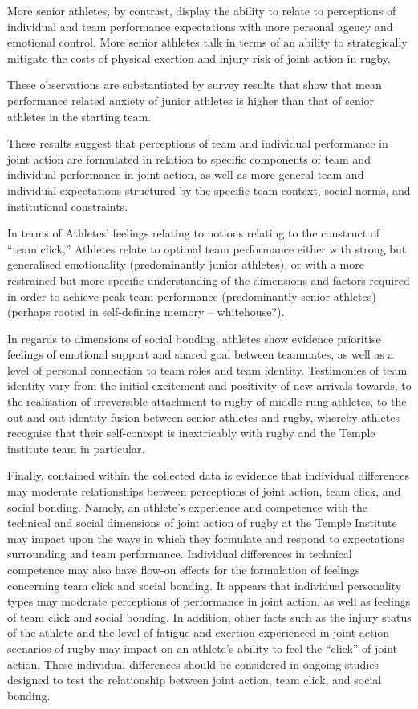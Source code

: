 More senior athletes, by contrast, display the ability to relate to perceptions of individual and team performance expectations with more personal agency and emotional control.  More senior athletes talk in terms of an ability to strategically mitigate the costs of physical exertion and injury risk of joint action in rugby,

These observations are substantiated by survey results that show that mean performance related anxiety of junior athletes is higher than that of senior athletes in the starting team.

These results suggest that perceptions of team and individual performance in joint action are formulated in relation to specific components of team and individual performance in joint action, as well as more general team and individual expectations structured by the specific team context, social norms, and institutional constraints.

In terms of Athletes' feelings relating to notions relating to the construct of ``team click,'' Athletes relate to optimal team performance either with strong but generalised emotionality (predominantly junior athletes), or with a more restrained but more specific understanding of the dimensions and factors required in order to achieve peak team performance (predominantly senior athletes) (perhaps rooted in self-defining memory -- whitehouse?).

In regards to dimensions of social bonding, athletes show evidence prioritise feelings of emotional support and shared goal between teammates, as well as a level of personal connection to team roles and team identity.  Testimonies of team identity vary from the initial excitement and positivity of new arrivals towards, to the realisation of irreversible attachment to rugby of middle-rung athletes, to the out and out identity fusion between senior athletes and rugby, whereby athletes recognise that their self-concept is inextricably with rugby and the Temple institute team in particular.


Finally, contained within the collected data is evidence that individual differences may moderate relationships between perceptions of joint action, team click, and social bonding.  Namely, an athlete's experience and competence with the technical and social dimensions of joint action of rugby at the Temple Institute may impact upon the ways in which they formulate and respond to expectations surrounding and team performance.  Individual differences in technical competence may also have flow-on effects for the formulation of feelings concerning team click and social bonding. It appears that individual personality types may moderate perceptions of performance in joint action, as well as feelings of team click and social bonding. In addition, other facts such as the injury status of the athlete and the level of fatigue and exertion experienced in joint action scenarios of rugby may impact on an athlete's ability to feel the ``click'' of joint action.  These individual differences should be considered in ongoing studies designed to test the relationship between joint action, team click, and social bonding.


